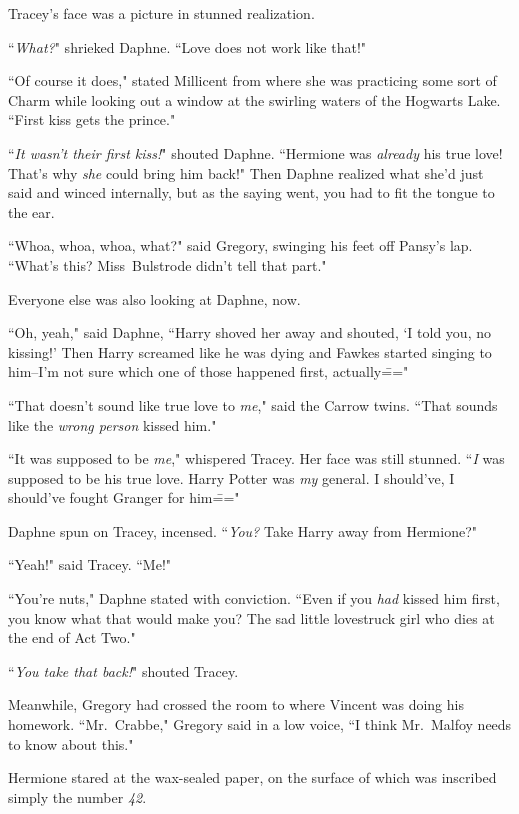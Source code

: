 Tracey's face was a picture in stunned realization.

``\emph{What?}" shrieked Daphne. ``Love does not work like that!"

``Of course it does," stated Millicent from where she was practicing some sort of Charm while looking out a window at the swirling waters of the Hogwarts Lake. ``First kiss gets the prince."

``\emph{It wasn't their first kiss!}" shouted Daphne. ``Hermione was \emph{already} his true love! That's why \emph{she} could bring him back!" Then Daphne realized what she'd just said and winced internally, but as the saying went, you had to fit the tongue to the ear.

``Whoa, whoa, whoa, what?" said Gregory, swinging his feet off Pansy's lap. ``What's this? Miss~Bulstrode didn't tell that part."

Everyone else was also looking at Daphne, now.

``Oh, yeah," said Daphne, ``Harry shoved her away and shouted, `I told you, no kissing!' Then Harry screamed like he was dying and Fawkes started singing to him\---I'm not sure which one of those happened first, actually\==="

``That doesn't sound like true love to \emph{me}," said the Carrow twins. ``That sounds like the \emph{wrong person} kissed him."

``It was supposed to be \emph{me}," whispered Tracey. Her face was still stunned. ``\emph{I} was supposed to be his true love. Harry Potter was \emph{my} general. I should've, I should've fought Granger for him\==="

Daphne spun on Tracey, incensed. ``\emph{You?} Take Harry away from Hermione?"

``Yeah!" said Tracey. ``Me!"

``You're nuts," Daphne stated with conviction. ``Even if you \emph{had} kissed him first, you know what that would make you? The sad little lovestruck girl who dies at the end of Act Two."

``\emph{You take that back!}" shouted Tracey.

Meanwhile, Gregory had crossed the room to where Vincent was doing his homework. ``Mr.~Crabbe," Gregory said in a low voice, ``I think Mr.~Malfoy needs to know about this."


Hermione stared at the wax-sealed paper, on the surface of which was inscribed simply the number \emph{42}.

